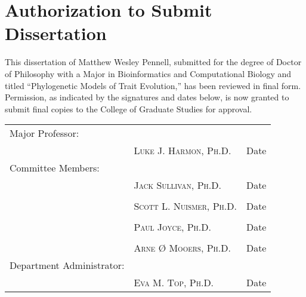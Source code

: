 \chapter*{Authorization to Submit Dissertation}

This dissertation of Matthew Wesley Pennell, submitted for the degree of Doctor of Philosophy with a Major in Bioinformatics and Computational Biology and titled ``Phylogenetic Models of Trait Evolution,'' has been reviewed in final form. Permission, as indicated by the signatures and dates below, is now granted to submit final copies to the College of Graduate Studies for approval.

\vspace{1in}

\begin{center}
\begin{tabular}{ p{}  p{}  p{} }
Major Professor: & \hrulefill & \hrulefill\\[-8pt]
 & \textsc{Luke J. Harmon, Ph.D.} & Date\\[18pt]
Committee Members: & \hrulefill & \hrulefill\\[-8pt]
 & \textsc{Jack Sullivan, Ph.D.} & Date\\[18pt]
 & \hrulefill & \hrulefill\\[-8pt]
 & \textsc{Scott L. Nuismer, Ph.D.} & Date\\[18pt]
& \hrulefill & \hrulefill\\[-8pt]
 & \textsc{Paul Joyce, Ph.D.} & Date\\[18pt]
& \hrulefill & \hrulefill\\[-8pt]
 & \textsc{Arne {\O} Mooers, Ph.D.} & Date\\[18pt]
Department Administrator: & \hrulefill & \hrulefill\\[-8pt]
 & \textsc{Eva M. Top, Ph.D.} & Date\\[18pt]
\end{tabular}
\end{center}


 
